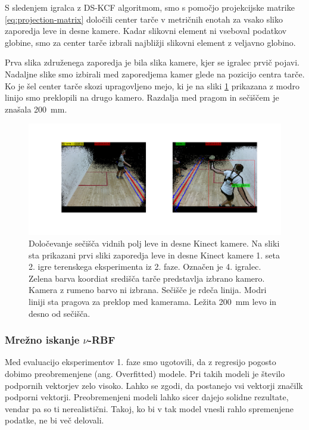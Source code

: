 S sledenjem igralca z DS-KCF algoritmom, smo s pomočjo projekcijske matrike \eqref{eq:projection-matrix} določili center tarče v metričnih enotah za vsako sliko zaporedja leve in desne kamere. Kadar slikovni element ni vseboval podatkov globine, smo za center tarče izbrali najbližji slikovni element z veljavno globino.

Prva slika združenega zaporedja je bila slika kamere, kjer se igralec prvič pojavi. Nadaljne slike smo izbirali med zaporedjema kamer glede na pozicijo centra tarče. Ko je šel center tarče skozi upragovljeno mejo, ki je na sliki \ref{fig:zdruzevanje} prikazana z modro linijo smo preklopili na drugo kamero. Razdalja med pragom in sečiščem je znašala \SI{200}{mm}.


\begin{figure}[htb]
	\centering
	\includegraphics[width=\columnwidth]{./Slike/zdruzevanje-example.png}
	\caption[Določevanje sečišča vidnih polj leve in desne Kinect kamere]{Določevanje sečišča vidnih polj leve in desne Kinect kamere. Na sliki sta prikazani prvi sliki zaporedja leve in desne Kinect kamere 1. seta 2. igre terenskega eksperimenta iz 2. faze. Označen je 4. igralec. Zelena barva koordiat središča tarče predstavlja izbrano kamero. Kamera z rumeno barvo ni izbrana. Sečišče je rdeča linija. Modri liniji sta pragova za preklop med kamerama. Ležita \SI{200}{mm} levo in desno od sečišča.}
	\label{fig:zdruzevanje}
\end{figure}



\subsubsection{Mrežno iskanje \texorpdfstring{$\nu$}{nu}-RBF}
Med evaluacijo eksperimentov 1. faze smo ugotovili, da z regresijo \esvr pogosto dobimo preobremenjene (ang. Overfitted) modele. Pri takih modeli je število podpornih vektorjev zelo visoko. Lahko se zgodi, da postanejo vsi vektorji značilk podporni vektorji. Preobremenjeni modeli lahko sicer dajejo solidne rezultate, vendar pa so ti nerealistični. Takoj, ko bi v tak model vnesli rahlo spremenjene podatke, ne bi več delovali.

